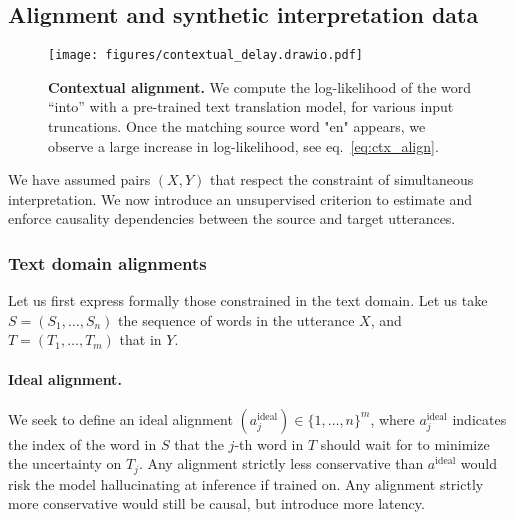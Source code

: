 \subsection{Alignment and synthetic interpretation data}
\label{sec:alignment}


\begin{figure}[t]
    \centering
    \texttt{[image: figures/contextual\_delay.drawio.pdf]}
    \caption{\textbf{Contextual alignment.}
    We compute the log-likelihood of the word ``into'' with a pre-trained text translation model, for various input truncations. Once the matching source word "en" appears, we observe a large increase in log-likelihood,  see eq.~\eqref{eq:ctx_align}.}
    \label{fig:contextual-delays-tokens}
\end{figure}

We have assumed pairs $(X, Y)$
that respect the constraint of simultaneous interpretation.
We now introduce an unsupervised criterion to estimate and enforce causality
dependencies between the source and target utterances.


\subsubsection{Text domain alignments}
\label{sec:text-domain-align}
Let us first express formally those constrained in the text domain.
Let us take $S = (S_1, \ldots, S_n)$ the sequence of words
in the utterance $X$, and $T = (T_1, \ldots, T_m)$
that in $Y$.

\paragraph{Ideal alignment.}
We seek to define an ideal alignment $(a^{\text{ideal}}_{j}) \in \{1,\ldots, n\}^m$, where
$a^{\text{ideal}}_{j}$ indicates the index of the word in $S$ that the $j$-th word in $T$
should wait for to minimize the uncertainty on $T_j$. 
Any alignment strictly less conservative than $a^{\text{ideal}}$
would risk the model hallucinating at inference if trained on.
Any alignment strictly more conservative would still be causal,
but introduce more latency.


